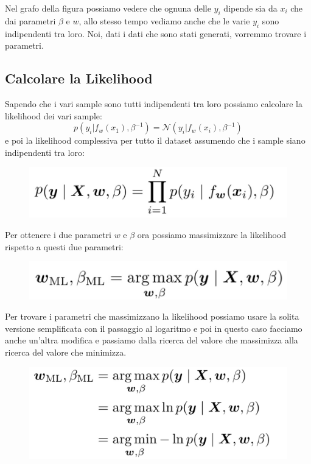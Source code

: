 \documentclass[14pt]{extreport}
\begin{document}
Nel grafo della figura possiamo vedere che ognuna delle $y_i$ dipende sia da $x_i$ che dai parametri $\beta$ e $w$, allo stesso tempo vediamo anche
che le varie $y_i$ sono indipendenti tra loro. Noi, dati i dati che sono stati generati, vorremmo trovare i parametri.

\subsection{Calcolare la Likelihood}

Sapendo che i vari sample sono tutti indipendenti tra loro possiamo calcolare la likelihood dei vari sample: $$p(y_i | f_w(x_1),
	\beta^{-1})=\mathcal{N}(y_i|f_w(x_i),\beta^{-1})$$ e poi la likelihood complessiva per tutto il dataset assumendo che i sample siano indipendenti
	tra loro:

\begin{figure}[H]
	\centering
	\includegraphics[width=0.5\linewidth]{105.jpeg}
\end{figure}

Per ottenere i due parametri $w$ e $\beta$ ora possiamo massimizzare la likelihood rispetto a questi due parametri:

\begin{figure}[H]
	\centering
	\includegraphics[width=0.5\linewidth]{106.jpeg}
\end{figure}

Per trovare i parametri che massimizzano la likelihood possiamo usare la solita versione semplificata con il passaggio al logaritmo e poi in questo
caso facciamo anche un'altra modifica e passiamo dalla ricerca del valore che massimizza alla ricerca del valore che minimizza.

\begin{figure}[H]
	\centering
	\includegraphics[width=0.5\linewidth]{107.jpeg}
\end{figure}
\end{document}
